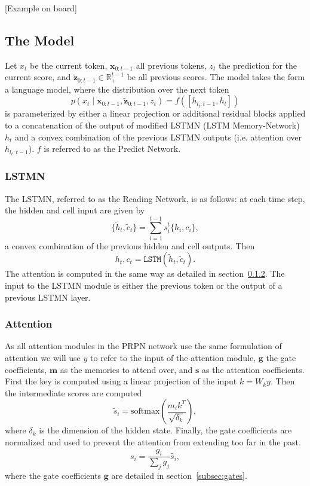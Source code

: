 \documentclass{article}
\newcommand{\bx}{\mathbf{x}}
\newcommand{\bz}{\mathbf{z}}
\newcommand{\R}{\mathbb{R}}
\begin{document}
[Example on board]

\subsection{The Model}
Let $x_t$ be the current token, $\bx_{0:t-1}$ all previous tokens, $z_t$ the prediction for the current score,
and $\tilde{\bz}_{0:t-1}\in\R^{t-1}_+$ be all previous scores.
The model takes the form a language model, where
the distribution over the next token
$$p(x_t\mid \bx_{0:t-1}, \tilde{\bz}_{0:t-1},z_t) = f([h_{l_t:t-1},h_t])$$
is parameterized by either a linear projection or additional residual blocks
applied to a concatenation of the output of modified LSTMN (LSTM Memory-Network) $h_t$
and a convex combination of the previous LSTMN outputs (i.e. attention over $h_{l_t:t-1}$).
$f$ is referred to as the Predict Network.

\subsubsection{LSTMN}
\label{subsec:lstmn}
The LSTMN, referred to as the Reading Network, is as follows:
at each time step, the hidden and cell input are given by
$$\{\tilde{h}_t,\tilde{c}_t\} = \sum_{i=1}^{t-1} s_i^t\{h_i,c_i\},$$
a convex combination of the previous hidden and cell outputs.
Then $$h_t,c_t = \texttt{LSTM}(\tilde{h}_t,\tilde{c}_t).$$
The attention is computed in the same way as detailed in section~\ref{subsec:attn}.
The input to the LSTMN module is either the previous token or the
output of a previous LSTMN layer.

\subsubsection{Attention}
\label{subsec:attn}
As all attention modules in the PRPN network use the same formulation of attention we will use 
$y$ to refer to the input of the attention module, $\bm{g}$ the gate coefficients,
$\bm{m}$ as the memories to attend over, and $\bm{s}$ as the attention coefficients.
First the key is computed using a linear projection of the input $k = W_ky$.
Then the intermediate scores are computed
$$\tilde{s}_i = \textrm{softmax}\left(\frac{m_ik^T}{\sqrt{\delta_k}}\right),$$
where $\delta_k$ is the dimension of the hidden state.
Finally, the gate coefficients are normalized and used to prevent the attention from
extending too far in the past.
$$s_i = \frac{g_i}{\sum_jg_j}\tilde{s_i},$$
where the gate coefficients $\bm{g}$ are detailed in section~\ref{subsec:gates}.
\end{document}

